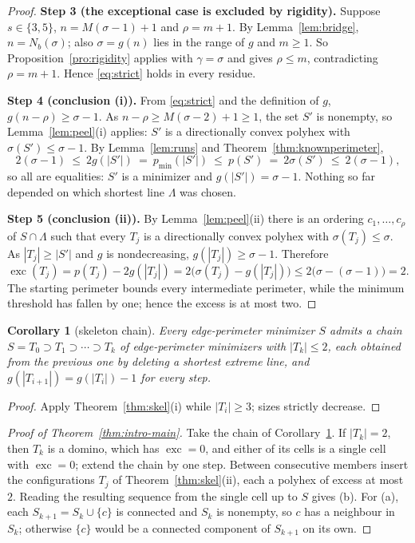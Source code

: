 \documentclass[11pt]{article}
\theoremstyle{plain}
\newtheorem{corollary}[theorem]{Corollary}
\theoremstyle{definition}
\theoremstyle{remark}
\DeclareMathOperator{\exc}{exc}
\begin{document}
\begin{proof}
\medskip\noindent\textbf{Step 3 (the exceptional case is excluded by rigidity).}
Suppose \(s\in\{3,5\}\), \(n=M(\sigma-1)+1\) and \(\rho=m+1\). By
Lemma~\ref{lem:bridge}, \(n=N_{b}(\sigma)\); also \(\sigma=g(n)\) lies in the range of \(g\)
and \(m\ge1\). So Proposition~\ref{pro:rigidity} applies with \(\gamma=\sigma\) and gives
\(\rho\le m\),
contradicting \(\rho=m+1\). Hence \eqref{eq:strict} holds in every residue.

\medskip\noindent\textbf{Step 4 (conclusion (i)).}
From \eqref{eq:strict} and the definition of \(g\), \(g(n-\rho)\ge\sigma-1\). As
\(n-\rho\ge M(\sigma-2)+1\ge1\), the set \(S'\) is nonempty, so Lemma~\ref{lem:peel}(i)
applies: \(S'\) is a directionally convex polyhex with \(\sigma(S')\le\sigma-1\). By
Lemma~\ref{lem:runs} and Theorem~\ref{thm:knownperimeter},
\[
   2(\sigma-1)\ \le\ 2g(|S'|)\ =\ p_{\min}(|S'|)\ \le\ p(S')\ =\ 2\sigma(S')\ \le\ 2(\sigma-1),
\]
so all are equalities: \(S'\) is a minimizer and \(g(|S'|)=\sigma-1\). Nothing so far
depended on which shortest line \(\Lambda\) was chosen.

\medskip\noindent\textbf{Step 5 (conclusion (ii)).}
By Lemma~\ref{lem:peel}(ii) there is an ordering \(c_{1},\dots,c_{\rho}\) of
\(S\cap\Lambda\) such that every \(T_{j}\) is a directionally convex polyhex with
\(\sigma(T_{j})\le\sigma\). As \(|T_{j}|\ge|S'|\) and \(g\) is nondecreasing,
\(g(|T_{j}|)\ge\sigma-1\). Therefore
\[
   \exc(T_{j})=p(T_{j})-2g(|T_{j}|)=2\bigl(\sigma(T_{j})-g(|T_{j}|)\bigr)
   \le2\bigl(\sigma-(\sigma-1)\bigr)=2 .
\]
The starting perimeter bounds every intermediate perimeter, while the minimum threshold
has fallen by one; hence the excess is at most two.
\end{proof}

\begin{corollary}[skeleton chain]\label{cor:skel}
Every edge-perimeter minimizer \(S\) admits a chain
\(S=T_{0}\supset T_{1}\supset\cdots\supset T_{k}\) of edge-perimeter minimizers with
\(|T_{k}|\le2\), each obtained from the previous one by deleting a shortest extreme line, and
\(g(|T_{i+1}|)=g(|T_{i}|)-1\) for every step.
\end{corollary}

\begin{proof}
Apply Theorem~\ref{thm:skel}(i) while \(|T_{i}|\ge3\); sizes strictly decrease.
\end{proof}

\begin{proof}[Proof of Theorem~\ref{thm:intro-main}]
Take the chain of Corollary~\ref{cor:skel}. If \(|T_{k}|=2\), then \(T_{k}\) is a domino,
which has \(\exc=0\), and either of its cells is a single cell with \(\exc=0\); extend the
chain by one step. Between consecutive members insert the configurations
\(T_{j}\) of Theorem~\ref{thm:skel}(ii), each a polyhex of excess at most \(2\). Reading the
resulting sequence from the single cell up to \(S\) gives (b). For (a), each
\(S_{k+1}=S_{k}\cup\{c\}\) is connected and \(S_{k}\) is nonempty, so \(c\) has a neighbour
in \(S_{k}\); otherwise \(\{c\}\) would be a connected component of \(S_{k+1}\) on its own.
\end{proof}
\end{document}
